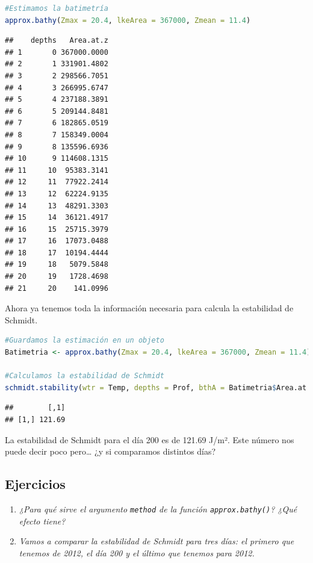 \documentclass[
]{book}
\newcommand{\passthrough}[1]{#1}
\providecommand{\tightlist}{%
  \setlength{\itemsep}{0pt}\setlength{\parskip}{0pt}}
\begin{document}
\begin{lstlisting}[language=R]
#Estimamos la batimetría
approx.bathy(Zmax = 20.4, lkeArea = 367000, Zmean = 11.4) 
\end{lstlisting}

\begin{lstlisting}
##    depths   Area.at.z
## 1       0 367000.0000
## 2       1 331901.4802
## 3       2 298566.7051
## 4       3 266995.6747
## 5       4 237188.3891
## 6       5 209144.8481
## 7       6 182865.0519
## 8       7 158349.0004
## 9       8 135596.6936
## 10      9 114608.1315
## 11     10  95383.3141
## 12     11  77922.2414
## 13     12  62224.9135
## 14     13  48291.3303
## 15     14  36121.4917
## 16     15  25715.3979
## 17     16  17073.0488
## 18     17  10194.4444
## 19     18   5079.5848
## 20     19   1728.4698
## 21     20    141.0996
\end{lstlisting}

Ahora ya tenemos toda la información necesaria para calcula la estabilidad de Schmidt.

\begin{lstlisting}[language=R]
#Guardamos la estimación en un objeto
Batimetria <- approx.bathy(Zmax = 20.4, lkeArea = 367000, Zmean = 11.4)

#Calculamos la estabilidad de Schmidt
schmidt.stability(wtr = Temp, depths = Prof, bthA = Batimetria$Area.at.z, bthD =  Batimetria$depths)
\end{lstlisting}

\begin{lstlisting}
##        [,1]
## [1,] 121.69
\end{lstlisting}

La estabilidad de Schmidt para el día 200 es de 121.69 J/m². Este número nos puede decir poco pero\ldots{} ¿y si comparamos distintos días?

\hypertarget{ejercicios-5}{%
\subsection{Ejercicios}\label{ejercicios-5}}

\begin{enumerate}
\def\labelenumi{\arabic{enumi}.}
\tightlist
\item
  \emph{¿Para qué sirve el argumento \passthrough{\lstinline!method!} de la función \passthrough{\lstinline!approx.bathy()!}? ¿Qué efecto tiene?}
\item
  \emph{Vamos a comparar la estabilidad de Schmidt para tres días: el primero que tenemos de 2012, el día 200 y el último que tenemos para 2012.}
\end{enumerate}
\end{document}

